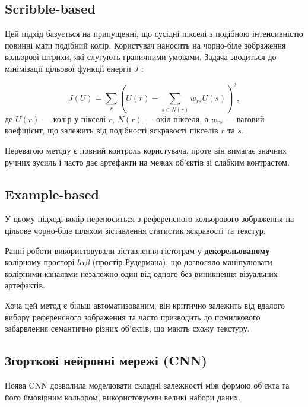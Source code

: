         \subsection{Scribble-based}
            Цей підхід базується на припущенні, що сусідні пікселі з подібною інтенсивністю повинні мати подібний колір.
            Користувач наносить на чорно-біле зображення кольорові штрихи, які слугують граничними умовами.
            Задача зводиться до мінімізації цільової функції енергії $J$ \cite{2025-survey, 2004-colorization-using-optimization}:

            \begin{equation*}
                J(U) = \sum_{r} \left( U(r) - \sum_{s \in N(r)} w_{rs} U(s) \right)^2,            
            \end{equation*}
            де $ U(r)$ --- колір у пікселі $r$, $N(r)$ --- окіл пікселя, а $w_{rs}$ --- ваговий коефіцієнт, що залежить від подібності яскравості пікселів $r$ та $s$.

            Перевагою методу є повний контроль користувача, проте він вимагає значних ручних зусиль і часто дає артефакти на межах об'єктів зі слабким контрастом.

        \subsection{Example-based}
            У цьому підході колір переноситься з референсного кольорового зображення на цільове чорно-біле шляхом зіставлення статистик яскравості та текстур.
            
            Ранні роботи \cite{2001-reinhard-color-transfer,2002-welsh-transferring-color} використовували зіставлення гістограм у \textbf{декорельованому} колірному просторі $l\alpha\beta$ (простір Рудермана), що дозволяло маніпулювати колірними каналами незалежно один від одного без виникнення візуальних артефактів.
            
            Хоча цей метод є більш автоматизованим, він критично залежить від вдалого вибору референсного зображення та часто призводить до помилкового забарвлення семантично різних об'єктів, що мають схожу текстуру.

        \subsection{Згорткові нейронні мережі (CNN)}
            Поява CNN дозволила моделювати складні залежності між формою об'єкта та його ймовірним кольором, використовуючи великі набори даних.

